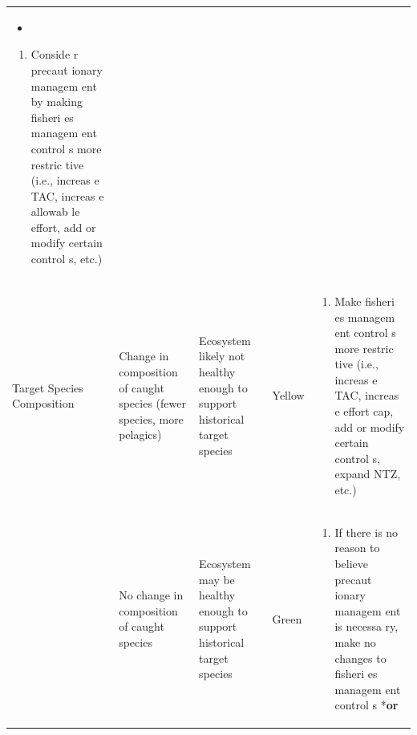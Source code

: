 \documentclass[]{book}
\providecommand{\tightlist}{%
  \setlength{\itemsep}{0pt}\setlength{\parskip}{0pt}}
\begin{document}
\begin{longtable}[]{@{}lllll@{}}
\begin{minipage}[t]{0.19\columnwidth}
\begin{itemize}
\item
\end{itemize}

\begin{enumerate}
\def\labelenumi{\arabic{enumi}.}
\setcounter{enumi}{1}
\tightlist
\item
  Conside r precaut ionary managem ent by making fisheri es managem ent
  control s more restric tive (i.e., increas e TAC, increas e allowab le
  effort, add or modify certain control s, etc.)
\end{enumerate}\strut
\end{minipage}\tabularnewline
\begin{minipage}[t]{0.19\columnwidth}\raggedright\strut
Target Species Composition\strut
\end{minipage} & \begin{minipage}[t]{0.19\columnwidth}\raggedright\strut
Change in composition of caught species (fewer species, more
pelagics)\strut
\end{minipage} & \begin{minipage}[t]{0.19\columnwidth}\raggedright\strut
Ecosystem likely not healthy enough to support historical target
species\strut
\end{minipage} & \begin{minipage}[t]{0.19\columnwidth}\raggedright\strut
Yellow\strut
\end{minipage} & \begin{minipage}[t]{0.19\columnwidth}\raggedright\strut
\begin{enumerate}
\def\labelenumi{\arabic{enumi}.}
\tightlist
\item
  Make fisheri es managem ent control s more restric tive (i.e., increas
  e TAC, increas e effort cap, add or modify certain control s, expand
  NTZ, etc.)
\end{enumerate}\strut
\end{minipage}\tabularnewline
\begin{minipage}[t]{0.19\columnwidth}\raggedright\strut
\strut
\end{minipage} & \begin{minipage}[t]{0.19\columnwidth}\raggedright\strut
No change in composition of caught species\strut
\end{minipage} & \begin{minipage}[t]{0.19\columnwidth}\raggedright\strut
Ecosystem may be healthy enough to support historical target
species\strut
\end{minipage} & \begin{minipage}[t]{0.19\columnwidth}\raggedright\strut
Green\strut
\end{minipage} & \begin{minipage}[t]{0.19\columnwidth}\raggedright\strut
\begin{enumerate}
\def\labelenumi{\arabic{enumi}.}
\tightlist
\item
  If there is no reason to believe precaut ionary managem ent is necessa
  ry, make no changes to fisheri es managem ent control s *\textbf{or}
\end{enumerate}


\end{minipage}
\end{longtable}
\end{document}
